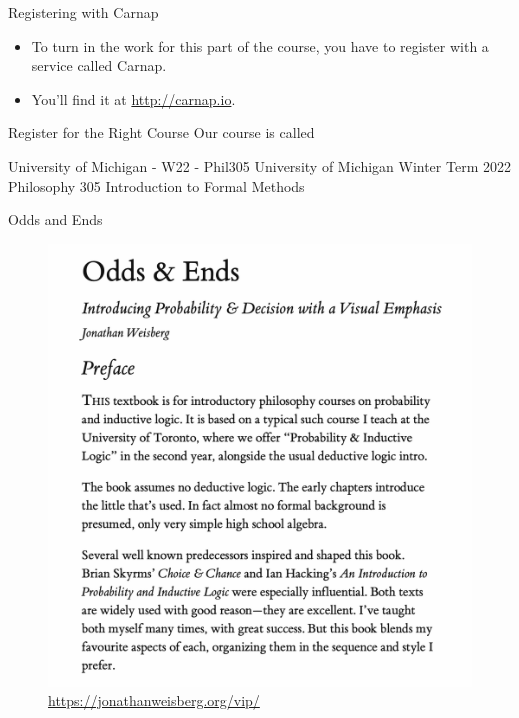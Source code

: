 \documentclass[
  ignorenonframetext,
]{beamer}
\providecommand{\tightlist}{%
  \setlength{\itemsep}{0pt}\setlength{\parskip}{0pt}}
\renewcommand{\,}{\text{, }}
\renewenvironment*{quote}	
	{\list{}{\rightmargin   \leftmargin} \item } 	
	{\endlist }
\begin{document}
\begin{frame}{Registering with Carnap}
\protect\hypertarget{registering-with-carnap}{}
\begin{itemize}
\tightlist
\item
  To turn in the work for this part of the course, you have to register
  with a service called Carnap.
\item
  You'll find it at \url{http://carnap.io}.
\end{itemize}
\end{frame}

\begin{frame}{Register for the Right Course}
\protect\hypertarget{register-for-the-right-course}{}
Our course is called

\begin{quote}
University of Michigan - W22 - Phil305 University of Michigan Winter
Term 2022 Philosophy 305 Introduction to Formal Methods
\end{quote}
\end{frame}

\begin{frame}{Odds and Ends}
\protect\hypertarget{odds-and-ends}{}
\begin{figure}
\centering
\includegraphics[width=\textwidth,height=0.8\textheight]{../images/1_1_Odds_and_Ends.png}
\caption{\url{https://jonathanweisberg.org/vip/}}
\end{figure}
\end{frame}
\end{document}
